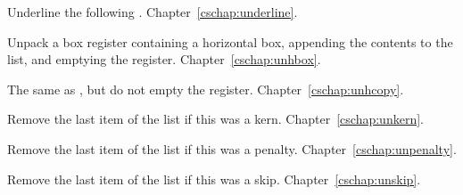 \begin{glossinventory}
\item [\cs{underline\gr{math field}}]
      Underline the following .
Chapter~\ref{cschap:underline}.

\item [\cs{unhbox\gr{8-bit number}}]
 \alt
      Unpack a box register containing a horizontal box,  
      appending the contents to the list, and emptying the register. 
Chapter~\ref{cschap:unhbox}.

\item [\cs{unhcopy\gr{8-bit number}}]
 \alt
      The same as , but do not empty the register. 
Chapter~\ref{cschap:unhcopy}.

\item [\cs{unkern}]
      Remove the last item of the list if this was a kern.
Chapter~\ref{cschap:unkern}.

\item [\cs{unpenalty}]
      Remove the last item of the list if this was a penalty.
Chapter~\ref{cschap:unpenalty}.

\item [\cs{unskip}]
      Remove the last item of the list if this was a skip.
Chapter~\ref{cschap:unskip}.


\end{glossinventory}

